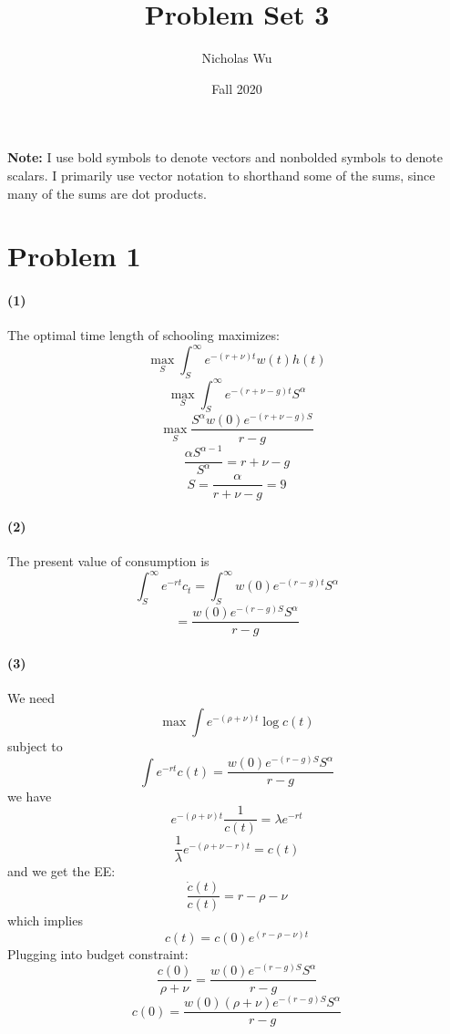 \documentclass[10pt,letter]{article}
\newcommand{\problem}[1]{\section*{Problem #1}}
\newcommand{\problempart}[1]{\paragraph{#1}}
\begin{document}


\title{Problem Set 3}

\author{Nicholas Wu}

\date{Fall 2020}

\maketitle
\textbf{Note:} I use bold symbols to denote vectors and nonbolded symbols to denote scalars. I primarily use vector notation to shorthand some of the sums, since many of the sums are dot products.

\problem{1}

\problempart{(1)}
The optimal time length of schooling maximizes:
\[ \max_S \int_S^\infty e^{-(r + \nu)t}w(t)h(t) \]
\[ \max_S \int_S^\infty e^{-(r+ \nu - g)t}S^{\alpha} \]
\[ \max_S \frac{S^{\alpha}w(0)e^{-(r+ \nu-g)S}}{r-g} \]
\[ \frac{\alpha S^{\alpha - 1}}{S^\alpha} = r+ \nu-g\]
\[  S = \frac{\alpha}{r+ \nu-g} = 9\]
\problempart{(2)}
The present value of consumption is
\[ \int_S^\infty e^{-rt}c_t = \int_S^\infty w(0) e^{-(r-g)t}S^\alpha \]
\[  = \frac{w(0) e^{-(r-g)S}S^\alpha }{r-g}\]
\problempart{(3)}
We need
\[ \max  \int e^{-(\rho + \nu)t} \log c(t) \]
subject to
\[ \int e^{- rt}c(t) = \frac{w(0) e^{-(r-g)S}S^\alpha }{r-g} \]
we have
\[ e^{-(\rho + \nu)t} \frac{1}{c(t)} = \lambda e^{-rt}\]
\[ \frac{1}{\lambda }e^{-(\rho + \nu - r)t}  = c(t) \]
and we get the EE:
\[ \frac{\dot{c}(t)}{c(t)}= r - \rho - \nu  \]
which implies
\[ c(t) = c(0) e^{(r-\rho-\nu)t} \]
Plugging into budget constraint:
\[ \frac{c(0)}{\rho+\nu} = \frac{w(0) e^{-(r-g)S}S^\alpha }{r-g} \]
\[ c(0) = \frac{w(0)(\rho+\nu) e^{-(r-g)S}S^\alpha }{r-g} \]
\end{document}
